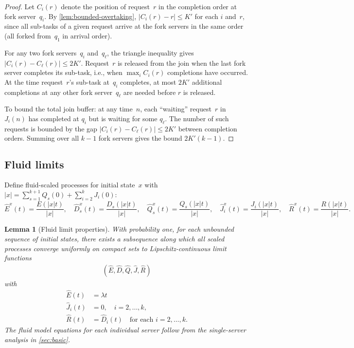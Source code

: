 \documentclass[11pt]{article}
\theoremstyle{plain}
\newtheorem{lemma}[theorem]{Lemma}
\theoremstyle{definition}
\theoremstyle{remark}
\begin{document}
\begin{proof}
Let $C_i(r)$ denote the position of request~$r$ in the completion order at fork server~$q_i$. By \cref{lem:bounded-overtaking}, $|C_i(r)-r|\le K'$ for each $i$ and~$r$, since all sub-tasks of a given request arrive at the fork servers in the same order (all forked from~$q_1$ in arrival order).

For any two fork servers~$q_i$ and~$q_\ell$, the triangle inequality gives $|C_i(r)-C_\ell(r)|\le 2K'$. Request~$r$ is released from the join when the last fork server completes its sub-task, i.e., when $\max_{i} C_i(r)$ completions have occurred. At the time request~$r$'s sub-task at~$q_i$ completes, at most $2K'$ additional completions at any other fork server~$q_\ell$ are needed before $r$ is released.

To bound the total join buffer: at any time~$n$, each ``waiting'' request~$r$ in $J_i(n)$ has completed at $q_i$ but is waiting for some $q_\ell$. The number of such requests is bounded by the gap $|C_i(r)-C_\ell(r)|\le 2K'$ between completion orders. Summing over all $k-1$ fork servers gives the bound $2K'(k-1)$.
\end{proof}

\subsection{Fluid limits}

Define fluid-scaled processes for initial state~$x$ with $|x|=\sum_{s=1}^{k+1}Q_s(0)+\sum_{i=2}^k J_i(0)$:
\[
\hat E^x(t) = \frac{E(|x|t)}{|x|}, \quad
\hat D_s^x(t) = \frac{D_s(|x|t)}{|x|}, \quad
\hat Q_s^x(t) = \frac{Q_s(|x|t)}{|x|}, \quad
\hat J_i^x(t) = \frac{J_i(|x|t)}{|x|}, \quad
\hat R^x(t) = \frac{R(|x|t)}{|x|}.
\]

\begin{lemma}[Fluid limit properties]\label{lem:fj-fluid-gen}
With probability one, for each unbounded sequence of initial states, there exists a subsequence along which all scaled processes converge uniformly on compact sets to Lipschitz-continuous limit functions
\begin{align*}
    (\hat E, \hat D, \hat Q, \hat J, \hat R)
\end{align*}
with
\begin{align}
\hat E(t) & =\lambda t \\
\hat J_i(t) &= 0, \quad i=2,\ldots,k, \label{eq:fj-fl-vanish}\\
\hat R(t) &= \hat D_i(t) \quad \text{for each } i=2,\ldots,k. \label{eq:fj-fl-rate}
\end{align}
The fluid model equations for each individual server follow from the single-server analysis in \cref{sec:basic}.
\end{lemma}
\end{document}
